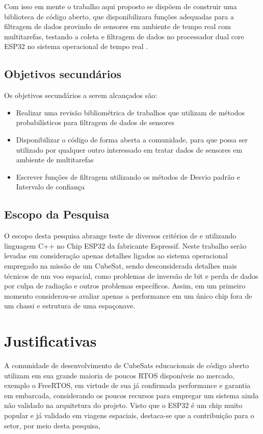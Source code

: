 Com isso em mente o trabalho aqui proposto se dispõem de construir uma biblioteca de código aberto, que disponibilizara funções adequadas para a filtragem de dados provindo de sensores em ambiente de tempo real com multitarefas, testando a coleta e filtragem de dados no processador dual core ESP32 no sistema operacional de tempo real \cite{Zephyr}.

\subsection{Objetivos secundários}
Os objetivos secundários a serem alcançados são:
\begin{itemize}
\item Realizar uma revisão bibliométrica de trabalhos que utilizam de métodos probabilísticos para filtragem de dados de sensores
\item Disponibilizar o código de forma aberta a comunidade, para que possa ser utilizado por qualquer outro interessado em tratar dados de sensores em ambiente de multitarefas
\item Escrever funções de filtragem utilizando os métodos de Desvio padrão e Intervalo de confiança
\end{itemize}


\subsection{Escopo da Pesquisa}
O escopo desta pesquisa abrange teste de diversos critérios de \cite{Raymundo} e \cite{Garcia} utilizando linguagem C++ no Chip ESP32 da fabricante Espressif. Neste trabalho serão levadas em consideração apenas detalhes ligados ao sistema operacional empregado na missão de um CubeSat, sendo desconsiderada detalhes mais técnicos de um voo espacial, como problemas de inversão de bit e perda de dados por culpa de radiação e outros problemas específicos. Assim, em um primeiro momento considerou-se avaliar apenas a performance em um único chip fora de um chassi e estrutura de uma espaçonave.


\section{Justificativas}
A comunidade de desenvolvimento de CubeSats educacionais de código aberto utilizam em sua grande maioria de 
poucos RTOS disponíveis no mercado, exemplo o FreeRTOS, em virtude de sua já confirmada performance e garantia 
em embarcada, considerando os poucos recursos para empregar um sistema ainda não validado na arquitetura do 
projeto.
Visto que o ESP32 é um chip muito popular e já validado em viagens espaciais, destaca-se que 
a contribuição para o setor, por meio desta pesquisa, 


